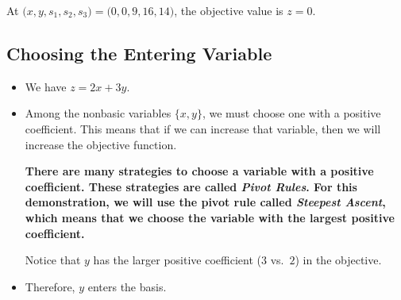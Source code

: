 %
%
%
%
At \(\bigl(x,y,s_1,s_2,s_3\bigr) = \bigl(0,0,9,16,14\bigr)\), the objective value is \(z=0\).

\subsection*{Choosing the Entering Variable}

\begin{itemize}
  \item We have \(z = 2x + 3y\).  
  \item Among the nonbasic variables \(\{x,y\}\), we must choose one with a positive coefficient.  This means that if we can increase that variable, then we will increase the objective function.
  
  \textbf{There are many strategies to choose a variable with a positive coefficient.  These strategies are called \emph{Pivot Rules}. For this  demonstration, we will use the pivot rule called \emph{Steepest Ascent}, which means that we choose the variable with the largest positive coefficient.}
  
  Notice that \(y\) has the larger positive coefficient (\(3\) vs.\ \(2\)) in the objective.
  \item Therefore, \(y\) enters the basis.
\end{itemize}

